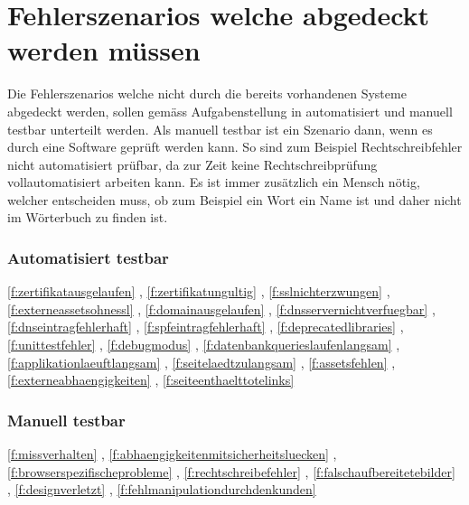 \section{Fehlerszenarios welche abgedeckt werden müssen}
\label{sec:fehlerszenarios_welche_abgedeckt_werden_müssen}
Die Fehlerszenarios welche nicht durch die bereits vorhandenen Systeme abgedeckt werden, sollen gemäss Aufgabenstellung in automatisiert und manuell testbar unterteilt werden. Als manuell testbar ist ein Szenario dann, wenn es durch eine Software geprüft werden kann. So sind zum Beispiel Rechtschreibfehler nicht automatisiert prüfbar, da zur Zeit keine Rechtschreibprüfung vollautomatisiert arbeiten kann. Es ist immer zusätzlich ein Mensch nötig, welcher entscheiden muss, ob zum Beispiel ein Wort ein Name ist und daher nicht im Wörterbuch zu finden ist.

\subsubsection{Automatisiert testbar}
\label{ssub:automatisiert_testbar}

\ref{f:zertifikatausgelaufen} \fzertifikatausgelaufen, \ref{f:zertifikatungultig} \fzertifikatungultig, \ref{f:sslnichterzwungen} \fsslnichterzwungen, \ref{f:externeassetsohnessl} \fexterneassetsohnessl, \ref{f:domainausgelaufen} \fdomainausgelaufen, \ref{f:dnsservernichtverfuegbar} \fdnsservernichtverfuegbar, \ref{f:dnseintragfehlerhaft} \fdnseintragfehlerhaft, \ref{f:spfeintragfehlerhaft} \fspfeintragfehlerhaft, \ref{f:deprecatedlibraries} \fdeprecatedlibraries, \ref{f:unittestfehler} \funittestfehler, \ref{f:debugmodus} \fdebugmodus, \ref{f:datenbankquerieslaufenlangsam} \fdatenbankquerieslaufenlangsam, \ref{f:applikationlaeuftlangsam} \fapplikationlaeuftlangsam, \ref{f:seitelaedtzulangsam} \fseitelaedtzulangsam, \ref{f:assetsfehlen} \fassetsfehlen, \ref{f:externeabhaengigkeiten} \fassetsfehlen, \ref{f:seiteenthaelttotelinks} \fseiteenthaelttotelinks

\subsubsection{Manuell testbar}
\label{ssub:manuel_testbar}

\ref{f:missverhalten} \fmissverhalten, \ref{f:abhaengigkeitenmitsicherheitsluecken} \fabhaengigkeitenmitsicherheitsluecken, \ref{f:browserspezifischeprobleme} \fbrowserspezifischeprobleme, \ref{f:rechtschreibefehler} \frechtschreibefehler, \ref{f:falschaufbereitetebilder} \ffalschaufbereitetebilder, \ref{f:designverletzt} \fdesignverletzt, \ref{f:fehlmanipulationdurchdenkunden} \ffehlmanipulationdurchdenkunden
